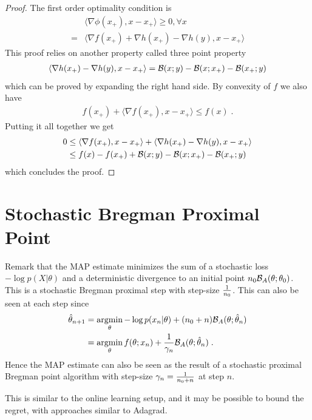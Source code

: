 \documentclass{article}
\newcommand{\logpart}{A}
\newcommand{\bregman}{\cB_\logpart}
\newcommand{\natp}{\theta}
\begin{document}
\begin{proof}
	The first order optimality condition is
	\begin{align}
		&\langle \nabla \phi (x_+) , x -  x_+ \rangle \geq 0, \forall x \\
		=& \langle \nabla f(x_+) + \nabla h(x_+) - \nabla h (y), x - x_+ \rangle  
	\end{align}
	This proof relies on another property called three point property 
	\begin{align}
		\langle \nabla h(x_+) - \nabla h (y), x - x_+ \rangle  ={\mathcal B}(x;y) -{\mathcal B}(x;x_+) - {\mathcal B}(x_+;y) 
	\end{align}
	which can be proved by expanding the right hand side.
	By convexity of $f$ we also have 
	\begin{align}
		 f(x_+) + \langle \nabla f(x_+), x - x_+ \rangle \leq f(x) \; .
	\end{align} 
	Putting it all together we get
	\begin{align}
		0 
		&\leq  \langle \nabla f(x_+), x - x_+ \rangle + \langle \nabla h(x_+) - \nabla h (y), x - x_+ \rangle  \\
		&\leq f(x) - f(x_+) + {\mathcal B}(x;y) -{\mathcal B}(x;x_+) - {\mathcal B}(x_+;y)
	\end{align}
	which concludes the proof.
\end{proof}

\section{Stochastic Bregman Proximal Point}
Remark that the MAP estimate minimizes the sum of a stochastic loss $ -\log p(X|\natp)$ and a deterministic divergence to an initial point $n_0 \bregman(\natp ; \natp_0)$. This is a stochastic Bregman proximal step with step-size $\frac{1}{n_0}$. This can also be seen at each step since
\begin{align}
    \hat \natp_{n+1} 
    &= \argmin_\natp -\log p(x_{n}|\natp) + (n_0 + n) \bregman(\natp ; \hat \natp_n) \\
    &= \argmin_\natp f(\natp; x_{n}) +  \inv{\gamma_{n}}\bregman(\natp ; \hat \natp_n) \; .
\end{align}
Hence the MAP estimate can also be seen as the result of a stochastic proximal Bregman point algorithm with step-size $\gamma_n = \frac{1}{n_0 + n}$ at step $n$.

This is similar to the online learning setup, and it may be possible to bound the regret, with approaches similar to Adagrad.
\end{document}
